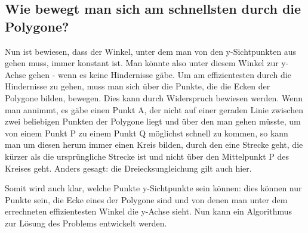 \documentclass[a4paper,10pt,ngerman]{scrartcl}
\begin{document}
\subsection{Wie bewegt man sich am schnellsten durch die Polygone?}
Nun ist bewiesen, dass der Winkel, unter dem man von den y-Sichtpunkten aus gehen muss, immer konstant ist. Man könnte also unter diesem Winkel zur y-Achse gehen - wenn es keine Hindernisse gäbe. Um am effizientesten durch die Hindernisse zu gehen, muss man sich über die Punkte, die die Ecken der Polygone bilden, bewegen. Dies kann durch Widerspruch bewiesen werden. Wenn man annimmt, es gäbe einen Punkt A, der nicht auf einer geraden Linie zwischen zwei beliebigen Punkten der Polygone liegt und über den man gehen müsste, um von einem Punkt P zu einem Punkt Q möglichst schnell zu kommen, so kann man um diesen herum immer einen Kreis bilden, durch den eine Strecke geht, die kürzer als die ursprüngliche Strecke ist und nicht über den Mittelpunkt P des Kreises geht. Anders gesagt: die Dreiecksungleichung gilt auch hier.
\begin{center}
\end{center}
Somit wird auch klar, welche Punkte y-Sichtpunkte sein können: dies können nur Punkte sein, die Ecke eines der Polygone sind und von denen man unter dem errechneten effizientesten Winkel die y-Achse sieht. Nun kann ein Algorithmus zur Lösung des Problems entwickelt werden.
\end{document}
